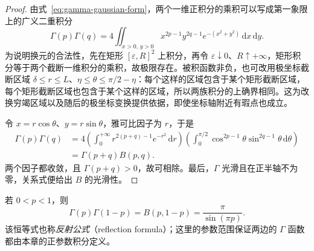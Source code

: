 \documentclass[UTF8,12pt,a4paper,fontset=fandol]{ctexbook}
\begin{document}
\begin{proof}
由式~\eqref{eq:gamma-gaussian-form}，两个一维正积分的乘积可以写成第一象限上的广义二重积分
\[
    \Gamma(p)\Gamma(q)
    =4\iint_{x>0,\,y>0}x^{2p-1}y^{2q-1}e^{-(x^2+y^2)}
       \,\mathrm{d}x\,\mathrm{d}y.
\]
为说明换元的合法性，先在矩形 $[\varepsilon,R]^2$ 上积分，再令 $\varepsilon\downarrow0$、$R\uparrow+\infty$，矩形积分等于两个截断一维积分的乘积，故极限存在。被积函数非负，也可改用极坐标截断区域 $\delta\leq r\leq L$、$\eta\leq\theta\leq\pi/2-\eta$：每个这样的区域包含于某个矩形截断区域，每个矩形截断区域也包含于某个这样的区域，所以两族积分的上确界相同。这为改换穷竭区域以及随后的极坐标变换提供依据，即使坐标轴附近有瑕点也成立。

令 $x=r\cos\theta$、$y=r\sin\theta$，雅可比因子为 $r$，于是
\begin{align*}
    \Gamma(p)\Gamma(q)
    &=4\left(\int_0^{+\infty}r^{2(p+q)-1}e^{-r^2}\,\mathrm{d}r\right)
       \left(\int_0^{\pi/2}\cos^{2p-1}\theta\sin^{2q-1}\theta
          \,\mathrm{d}\theta\right)\\
    &=\Gamma(p+q)B(p,q).
\end{align*}
两个因子都收敛，且 $\Gamma(p+q)>0$，故可相除。最后，$\Gamma$ 光滑且在正半轴不为零，关系式便给出 $B$ 的光滑性。
\end{proof}

\begin{theorem}[余元公式]
\label{thm:gamma-reflection-formula}
若 $0<p<1$，则
\begin{equation}
    \Gamma(p)\Gamma(1-p)=B(p,1-p)=\frac{\pi}{\sin(\pi p)}.
    \label{eq:gamma-reflection-formula}
\end{equation}
该恒等式也称\emph{反射公式}（reflection formula）；这里的参数范围保证两边的 $\Gamma$ 函数都由本章的正参数积分定义。
\end{theorem}
\end{document}
